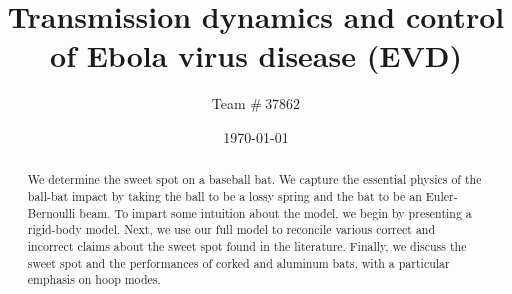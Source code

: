 \documentclass[a4paper, 11pt]{article}
\title{Transmission dynamics and control of Ebola virus disease (EVD)}
\author{Team $\#\ 37862$}
\date{\today}
\begin{document}
\begin{spacing}{1.2}
\begin{abstract}
We determine the sweet spot on a baseball bat. We capture the essential
physics of the ball-bat impact by taking the ball to be a lossy spring and the
bat to be an Euler-Bernoulli beam. To impart some intuition about the model,
we begin by presenting a rigid-body model. Next, we use our full model
to reconcile various correct and incorrect claims about the sweet spot found
in the literature. Finally, we discuss the sweet spot and the performances of
corked and aluminum bats, with a particular emphasis on hoop modes.

\end{abstract}

\maketitle
\pagestyle{empty}
\newpage
\tableofcontents
\listoffigures
\listoftables
\newpage
\pagestyle{fancy}


\medskip
 



\end{spacing}
\end{document}
